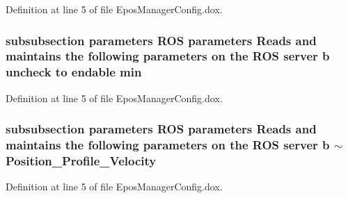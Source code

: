 \-Definition at line 5 of file \-Epos\-Manager\-Config.\-dox.

\subsubsection[{min}]{\setlength{\rightskip}{0pt plus 5cm}subsubsection parameters \-R\-O\-S parameters \-Reads and maintains the following parameters on the \-R\-O\-S server b uncheck to endable {\bf min}}\label{EposManagerConfig_8dox_a6642d0575df2282ce8200c40eb0ca2f5}


\-Definition at line 5 of file \-Epos\-Manager\-Config.\-dox.

\subsubsection[{$\sim$\-Position\-\_\-\-Profile\-\_\-\-Velocity}]{\setlength{\rightskip}{0pt plus 5cm}subsubsection parameters \-R\-O\-S parameters \-Reads and maintains the following parameters on the \-R\-O\-S server b $\sim$\-Position\-\_\-\-Profile\-\_\-\-Velocity}\label{EposManagerConfig_8dox_a93c1375bc21f47d13dfa69c3ba5302e0}


\-Definition at line 5 of file \-Epos\-Manager\-Config.\-dox.

